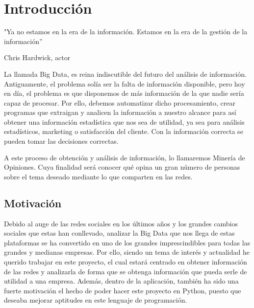 



	\chapter{Introducción}
	\epigraph{"Ya no estamos en la era de la información. Estamos en la era de la gestión de la información” }{Chris Hardwick, actor}
	
		La llamada Big Data, es reina indiscutible del futuro del análisis de información. Antiguamente, el problema solía ser la falta de información disponible, pero hoy en día, el problema es que disponemos de más información de la que nadie sería capaz de procesar. Por ello, debemos automatizar dicho procesamiento, crear programas que extraigan y analicen la información a nuestro alcance para así obtener una información estadística que nos sea de utilidad, ya sea para análisis estadísticos, marketing o satisfacción del cliente. Con la información correcta se pueden tomar las decisiones correctas.
		
		A este proceso de obtención y análisis de información, lo llamaremos Minería de Opiniones. Cuya finalidad será conocer qué opina un gran número de personas sobre el tema deseado mediante lo que comparten en las redes. 
		
		
	
	\section{Motivación}
	
	Debido al auge de las redes sociales en los últimos años y los grandes cambios sociales que estas han conllevado, analizar la Big Data que nos llega de estas plataformas se ha convertido en uno de los grandes imprescindibles para todas las grandes y medianas empresas. Por ello, siendo un tema de interés y actualidad he querido trabajar en este proyecto, el cual estará centrado en obtener información de las redes y analizarla de forma que se obtenga información que pueda serle de utilidad a una empresa. Además, dentro de la aplicación, también ha sido una fuerte motivación el hecho de poder hacer este proyecto en Python, puesto que deseaba mejorar aptitudes en este lenguaje de programación. 
	
